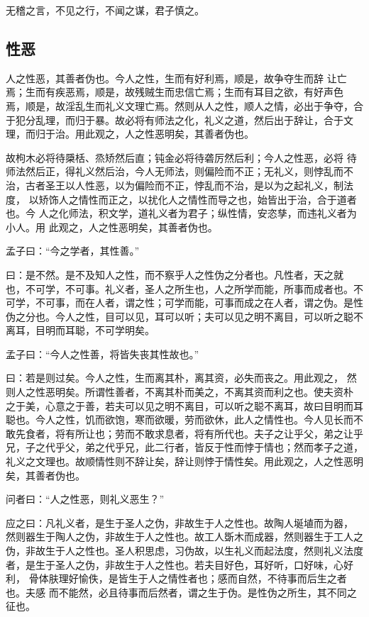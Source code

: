 \documentclass[]{article}
\begin{document}
无稽之言，不见之行，不闻之谋，君子慎之。

\hypertarget{header-n100}{%
\subsection{性恶}\label{header-n100}}

人之性恶，其善者伪也。今人之性，生而有好利焉，顺是，故争夺生而辞
让亡焉；生而有疾恶焉，顺是，故残贼生而忠信亡焉；生而有耳目之欲，有好声色
焉，顺是，故淫乱生而礼义文理亡焉。然则从人之性，顺人之情，必出于争夺，合于犯分乱理，而归于暴。故必将有师法之化，礼义之道，然后出于辞让，合于文
理，而归于治。用此观之，人之性恶明矣，其善者伪也。

故枸木必将待檃栝、烝矫然后直；钝金必将待砻厉然后利；今人之性恶，必将
待师法然后正，得礼义然后治，今人无师法，则偏险而不正；无礼义，则悖乱而不
治，古者圣王以人性恶，以为偏险而不正，悖乱而不治，是以为之起礼义，制法度，
以矫饰人之情性而正之，以扰化人之情性而导之也，始皆出于治，合于道者也。今
人之化师法，积文学，道礼义者为君子；纵性情，安恣孳，而违礼义者为小人。用
此观之，人之性恶明矣，其善者伪也。

孟子曰：``今之学者，其性善。''

曰：是不然。是不及知人之性，而不察乎人之性伪之分者也。凡性者，天之就
也，不可学，不可事。礼义者，圣人之所生也，人之所学而能，所事而成者也。不
可学，不可事，而在人者，谓之性；可学而能，可事而成之在人者，谓之伪。是性
伪之分也。今人之性，目可以见，耳可以听；夫可以见之明不离目，可以听之聪不
离耳，目明而耳聪，不可学明矣。

孟子曰：``今人之性善，将皆失丧其性故也。''

曰：若是则过矣。今人之性，生而离其朴，离其资，必失而丧之。用此观之，
然则人之性恶明矣。所谓性善者，不离其朴而美之，不离其资而利之也。使夫资朴
之于美，心意之于善，若夫可以见之明不离目，可以听之聪不离耳，故曰目明而耳
聪也。今人之性，饥而欲饱，寒而欲暖，劳而欲休，此人之情性也。今人见长而不
敢先食者，将有所让也；劳而不敢求息者，将有所代也。夫子之让乎父，弟之让乎
兄，子之代乎父，弟之代乎兄，此二行者，皆反于性而悖于情也；然而孝子之道，
礼义之文理也。故顺情性则不辞让矣，辞让则悖于情性矣。用此观之，人之性恶明
矣，其善者伪也。

问者曰：``人之性恶，则礼义恶生？''

应之曰：凡礼义者，是生于圣人之伪，非故生于人之性也。故陶人埏埴而为器，
然则器生于陶人之伪，非故生于人之性也。故工人斲木而成器，然则器生于工人之
伪，非故生于人之性也。圣人积思虑，习伪故，以生礼义而起法度，然则礼义法度
者，是生于圣人之伪，非故生于人之性也。若夫目好色，耳好听，口好味，心好利，
骨体肤理好愉佚，是皆生于人之情性者也；感而自然，不待事而后生之者也。夫感
而不能然，必且待事而后然者，谓之生于伪。是性伪之所生，其不同之征也。
\end{document}
